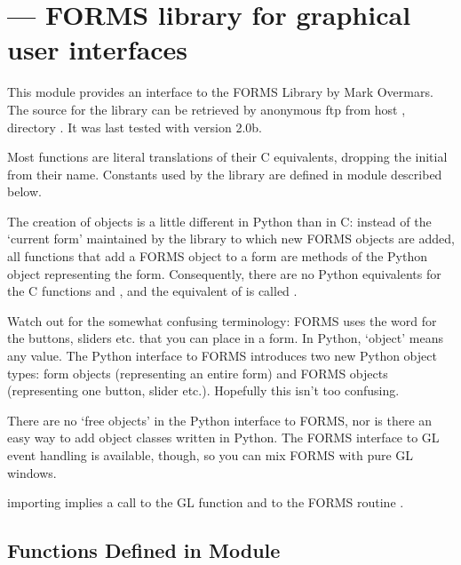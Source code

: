 \section{ ---
         FORMS library for graphical user interfaces}



This module provides an interface to the FORMS Library by Mark Overmars.  The source for the
library can be retrieved by anonymous ftp from host
, directory .  It was last tested
with version 2.0b.

Most functions are literal translations of their C equivalents,
dropping the initial  from their name.  Constants used by
the library are defined in module 
described below.

The creation of objects is a little different in Python than in C:
instead of the `current form' maintained by the library to which new
FORMS objects are added, all functions that add a FORMS object to a
form are methods of the Python object representing the form.
Consequently, there are no Python equivalents for the C functions
 and , and the
equivalent of  is called
.

Watch out for the somewhat confusing terminology: FORMS uses the word
 for the buttons, sliders etc. that you can place in a form.
In Python, `object' means any value.  The Python interface to FORMS
introduces two new Python object types: form objects (representing an
entire form) and FORMS objects (representing one button, slider etc.).
Hopefully this isn't too confusing.

There are no `free objects' in the Python interface to FORMS, nor is
there an easy way to add object classes written in Python.  The FORMS
interface to GL event handling is available, though, so you can mix
FORMS with pure GL windows.

 importing  implies a call to the GL
function  and to the FORMS routine
.

\subsection{Functions Defined in Module }


